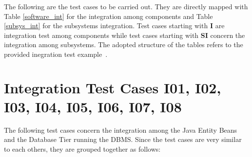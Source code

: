 The following are the test cases to be carried out. They are directly mapped with Table \ref{software_int} for the integration among components and Table \ref{subsys_int} for the subsystems integration. Test cases starting with \textbf{I} are integration test among components while test cases starting with \textbf{SI} concern the integration among subsystems. The adopted structure of the tables refers to the provided inegration test example~\cite{testplan_ex}.

\section{Integration Test Cases I01, I02, I03, I04, I05, I06, I07, I08}

The following test cases concern the integration among the Java Entity Beans and the Database Tier running the DBMS. Since the test cases are very similar to each others, they are grouped together as follows:

